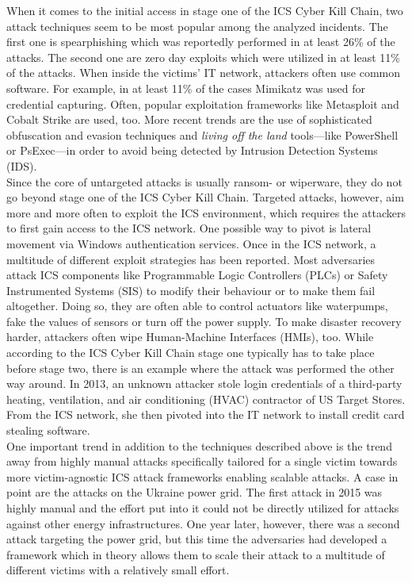 \documentclass[runningheads]{llncs}
\begin{document}
When it comes to the initial access in stage one of the ICS Cyber Kill Chain, two attack techniques seem to be most popular among the analyzed incidents.
The first one is spearphishing which was reportedly performed in at least 26\% of the attacks.
The second one are zero day exploits which were utilized in at least 11\% of the attacks.
When inside the victims' IT network, attackers often use common software.
For example, in at least 11\% of the cases Mimikatz was used for credential capturing.
Often, popular exploitation frameworks like Metasploit and Cobalt Strike are used, too.
More recent trends are the use of sophisticated obfuscation and evasion techniques and \textit{living off the land} tools---like PowerShell or PsExec---in order to avoid being detected by Intrusion Detection Systems (IDS).\\
Since the core of untargeted attacks is usually ransom- or wiperware, they do not go beyond stage one of the ICS Cyber Kill Chain.
Targeted attacks, however, aim more and more often to exploit the ICS environment, which requires the attackers to first gain access to the ICS network.
One possible way to pivot is lateral movement via Windows authentication services.
Once in the ICS network, a multitude of different exploit strategies has been reported.
Most adversaries attack ICS components like Programmable Logic Controllers (PLCs) or Safety Instrumented Systems (SIS) to modify their behaviour or to make them fail altogether.
Doing so, they are often able to control actuators like waterpumps, fake the values of sensors or turn off the power supply.
To make disaster recovery harder, attackers often wipe Human-Machine Interfaces (HMIs), too.
While according to the ICS Cyber Kill Chain stage one typically has to take place before stage two, there is an example where the attack was performed the other way around.
In 2013, an unknown attacker stole login credentials of a third-party heating, ventilation, and air conditioning (HVAC) contractor of US Target Stores.
From the ICS network, she then pivoted into the IT network to install credit card stealing software. \cite{hemsley.18}\\
One important trend in addition to the techniques described above is the trend away from highly manual attacks specifically tailored for a single victim towards more victim-agnostic ICS attack frameworks enabling scalable attacks.
A case in point are the attacks on the Ukraine power grid.
The first attack in 2015 was highly manual and the effort put into it could not be directly utilized for attacks against other energy infrastructures.
One year later, however, there was a second attack targeting the power grid, but this time the adversaries had developed a framework which in theory allows them to scale their attack to a multitude of different victims with a relatively small effort. \cite{greenberg.17}
\end{document}
